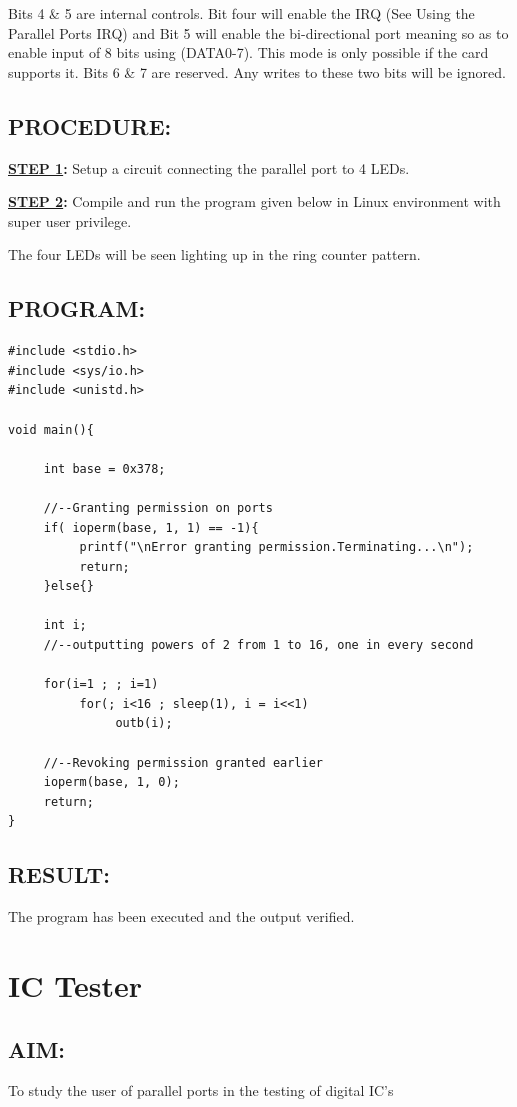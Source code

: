 \documentclass[a4paper,28pt,twoside,openright]{report}
\begin{document}
Bits 4 \& 5 are internal controls. Bit four will enable the IRQ (See Using the Parallel Ports IRQ) and Bit 5 will enable the bi-directional port meaning so as to enable input of 8 bits using (DATA0-7). This mode is only possible if the card supports it. Bits 6 \& 7 are reserved. Any writes to these two bits will be ignored. 

\section*{PROCEDURE:}
\textbf{\underline{STEP 1}:} 
Setup a circuit connecting the parallel port to 4 LEDs.

\textbf{\underline{STEP 2}:} Compile and run the program given below in Linux environment with super user privilege.

The four LEDs will be seen lighting up in the ring counter pattern.

\section*{PROGRAM:}
\begin{lstlisting}
#include <stdio.h>
#include <sys/io.h>
#include <unistd.h>

void main(){

     int base = 0x378;
     
     //--Granting permission on ports
     if( ioperm(base, 1, 1) == -1){
          printf("\nError granting permission.Terminating...\n");
          return;
     }else{}
     
     int i;
     //--outputting powers of 2 from 1 to 16, one in every second
     
     for(i=1 ; ; i=1)
          for(; i<16 ; sleep(1), i = i<<1)
               outb(i);
     
     //--Revoking permission granted earlier
     ioperm(base, 1, 0);
     return;  
}
\end{lstlisting}

\section*{RESULT:}
The program has been executed and the output verified.
%
%
%
%
\chapter{IC Tester}
%
%
\section*{AIM:}
To study the user of parallel ports in the testing of digital IC's
\end{document}
